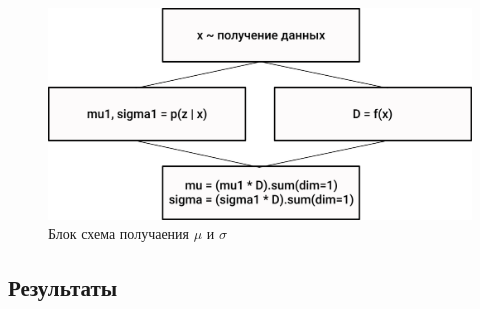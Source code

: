 \documentclass{article}
\begin{document}
\begin{figure}[h!]
  \includegraphics[width=\linewidth]{block-diagram.png}
  \caption{Блок схема получаения $\mu$ и $\sigma$}
  \label{fig:musigma}
\end{figure}

\subsection{Результаты}
\end{document}
